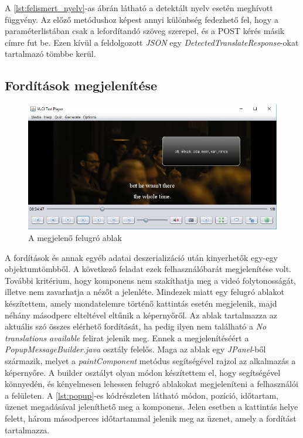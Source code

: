 A \ref{lst:felismert_nyelv}-as ábrán látható a detektált nyelv esetén meghívott függvény. Az előző metódushoz képest annyi különbség fedezhető fel, hogy a paraméterlistában csak a lefordítandó szöveg szerepel, és a POST kérés másik címre fut be. Ezen kívül a feldolgozott \textit{JSON} egy \textit{DetectedTranslateResponse}-okat tartalmazó tömbbe kerül. 

\subsection{Fordítások megjelenítése}
\begin{figure}
  \includegraphics[width=\linewidth]{images/popup.png}
  \caption{A megjelenő felugró ablak}
  \label{fig:popup}
\end{figure}

A fordítások és annak egyéb adatai deszerializáció után kinyerhetők egy-egy objektumtömbből. A következő feladat ezek felhasználóbarát megjelenítése volt. További kritérium, hogy komponens nem szakíthatja meg a videó folytonosságát, illetve nem zavarhatja a nézőt a jelenléte. Mindezek miatt egy felugró ablakot készítettem, amely mondatelemre történő kattintás esetén megjelenik, majd néhány másodperc elteltével eltűnik a képernyőről. Az ablak tartalmazza az aktuális szó összes elérhető fordítását, ha pedig ilyen nem található a \textit{No translations available} felirat jelenik meg. Ennek a megjelenítéséért a \textit{PopupMessageBuilder.java} osztály felelős. Maga az ablak egy \textit{JPanel}-ből származik, melyet a \textit{paintComponent} metódus segítségével rajzol az alkalmazás a képernyőre. A builder osztályt olyan módon készítettem el, hogy segítségével könnyedén, és kényelmesen lehessen felugró ablakokat megjeleníteni a felhasználói a felületen. A \ref{lst:popup}-es kódrészleten látható módon, pozíció, időtartam, üzenet megadásával jeleníthető meg a komponens. Jelen esetben a kattintás helye felett, három másodperces időtartammal jelenik meg az üzenet, amely a fordítást tartalmazza.

